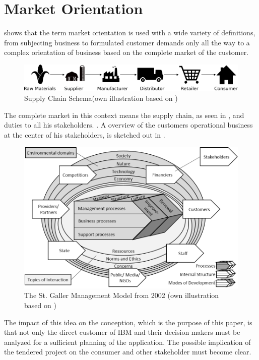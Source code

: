 \section{Market Orientation}
\textcite[9-10]{Claen2016} shows that the term market orientation is used with a wide variety of definitions, from subjecting business to formulated customer demands only all the way to a complex orientation of business based on the complete market of the customer.
\begin{figure}[H]
	\includegraphics[width=\textwidth]{img/supplychain.pdf}
	\caption[Supply Chain Schema]{Supply Chain Schema(own illustration based on \protect\cite{SouthwestTech})}
    	\label{fig:supplychain}
\end{figure}
The complete market in this context means the supply chain, as seen in , and duties to all his stakeholders. \parencite[cf.][22-23]{Claen.2016}. A overview of the customers operational business at the center of his stakeholders, is sketched out in .
\begin{figure}[H]
	\includegraphics[width=1\textwidth]{img/SGM.png}
	\caption[St. Galler Management Modell]{The St. Galler Management Model from 2002 (own illustration based on \protect\cite{RueggSturm.2003})}
	\label{fig:SGM}
\end{figure}
The impact of this idea on the conception, which is the purpose of this paper, is that not only the direct customer of IBM and their decision makers must be analyzed for a sufficient planning of the application. The possible implication of the tendered project on the consumer and other stakeholder must become clear.
